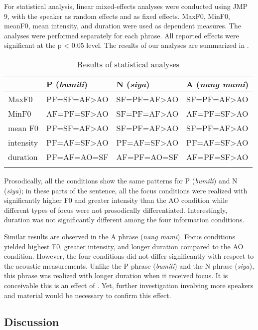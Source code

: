 \documentclass[output=paper]{langsci/langscibook}
\begin{document}
For statistical analysis, linear mixed-effects analyses were conducted using JMP 9, with the speaker as random effects and  as fixed effects. MaxF0, MinF0, meanF0, mean intensity, and duration were used as dependent measures. The analyses were performed separately for each phrase. All reported effects were significant at the p < 0.05 level. The results of our analyses are summarized in .

\begin{table}
	\begin{tabular}{llll}
		\lsptoprule
		& P (\textit{bumili}) & N (\textit{siya}) & A (\textit{nang mami})\\
		\midrule
		MaxF0 & PF=SF=AF>AO & SF=PF=AF>AO & SF=PF=AF>AO\\
		MinF0 & AF=PF=SF>AO & SF=PF=AF>AO & AF=PF=SF>AO\\
		mean F0 & PF=SF=AF>AO & SF=PF=AF>AO & SF=PF=AF>AO\\
		intensity & PF=AF=SF>AO & PF=AF=SF>AO & PF=AF=SF>AO\\
		duration & PF=AF=AO=SF & AF=PF=AO=SF & AF=PF=SF>AO\\
		\lspbottomrule
	\end{tabular}
	\caption{Results of statistical analyses}
	\label{tab:nagaya:3}
\end{table}

\newpage 
Prosodically, all the conditions show the same patterns for P (\textit{bumili}) and N (\textit{siya}); in these parts of the sentence, all the focus conditions were realized with significantly higher F0 and greater intensity than the AO condition while different types of focus were not prosodically differentiated. Interestingly, duration was not significantly different among the four information conditions. 

Similar results are observed in the A phrase (\textit{nang mami}). Focus conditions yielded highest F0, greater intensity, and longer duration compared to the AO condition. However, the four conditions did not differ significantly with respect to the acoustic measurements. Unlike the P phrase (\textit{bumili}) and the N phrase (\textit{siya}), this phrase was realized with longer duration when it received focus. It is conceivable this is an effect of . Yet, further investigation involving more speakers and material would be necessary to confirm this effect.

\subsection{\label{3.3}Discussion}
\end{document}

